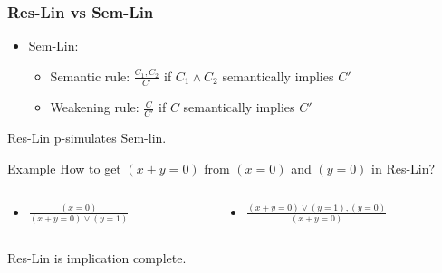 \begin{frame}
    \frametitle{Res-Lin vs Sem-Lin}

    \begin{itemize}
		\item Sem-Lin:
			\begin{itemize}
				\item Semantic rule: $\frac{C_1, C_2}{C'}$ if $C_1 \land C_2$
		            semantically implies $C'$
				\item Weakening rule: $\frac{C}{C'}$ if $C$ semantically implies $C'$
			\end{itemize}
	\end{itemize}

	\pause
    \begin{theorem}
        Res-Lin p-simulates Sem-lin.
    \end{theorem}

	\pause
    \begin{block}{Example}
        How to get $(x + y = 0)$ from $(x = 0)$ and $(y = 0)$ in Res-Lin?
    \end{block}


    \begin{columns}
		\begin{column}{5cm}
            \begin{itemize}
            	\item $\frac{(x = 0)}{(x + y = 0) \lor (y = 1)}$
            \end{itemize}
		\end{column}
		\begin{column}{5cm}
            \begin{itemize}
            	\item $\frac{(x + y = 0) \lor (y = 1),(y = 0)}{(x + y = 0)}$
            \end{itemize}
		\end{column}
	\end{columns}

	\pause
    \begin{theorem}
        Res-Lin is implication complete.
    \end{theorem}


\end{frame}
